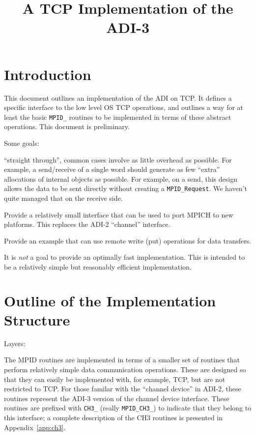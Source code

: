 \documentclass{article}
\def\code#1{\texttt{#1}}
\begin{document}
\title{A TCP Implementation of the ADI-3}
\author{}
\maketitle

\begin{abstract}

\end{abstract}

\section{Introduction}
This document outlines an implementation of the ADI on TCP.  It defines a
specific interface to the low level OS TCP operations, and outlines a way
for at least the basic \code{MPID_} routines to be implemented in terms of
these 
abstract operations.  This document is preliminary.

Some goals:

``straight through'', common cases involve as little overhead as possible.
For example, a send/receive of a single word should generate as few ``extra''
allocations of internal objects as possible.  For example, on a send, this
design allows the data to be sent directly without creating a
\code{MPID_Request}. We haven't quite managed that on the receive side.

Provide a relatively small interface that can be used to port MPICH to new
platforms.  This replaces the ADI-2 ``channel'' interface.

Provide an example that can use remote write (put) operations for data
transfers.  

It is \emph{not} a goal to provide an optimally fast implementation. This is
intended to be a relatively simple but reasonably efficient implementation.

\section{Outline of the Implementation Structure}

Layers: 

The MPID routines are implemented in terms of a smaller set of routines that
perform relatively simple data communication operations.  These are designed
so that they can easily be implemented with, for example, TCP, but are not
restricted to TCP.  For those familar with the ``channel device'' in ADI-2,
these routines represent the ADI-3 version of the channel device interface.
These routines are prefixed with \code{CH3_} (really \code{MPID_CH3_}) to
indicate that they belong to 
this interface; a complete description of the CH3 routines is presented in
Appendix~\ref{app:ch3}. 
\end{document}
